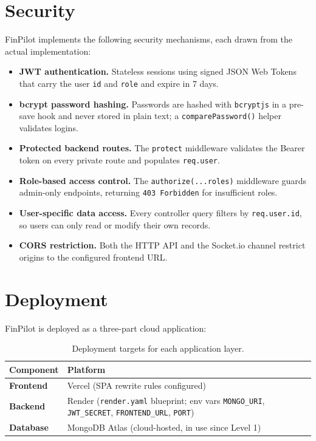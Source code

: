 \documentclass[11pt,a4paper]{report}
\begin{document}
\chapter{Security}
FinPilot implements the following security mechanisms, each drawn from the actual
implementation:
\begin{itemize}[leftmargin=1.4em]
  \item \textbf{JWT authentication.} Stateless sessions using signed JSON Web
        Tokens that carry the user \texttt{id} and \texttt{role} and expire in 7
        days.
  \item \textbf{bcrypt password hashing.} Passwords are hashed with
        \texttt{bcryptjs} in a pre-save hook and never stored in plain text; a
        \texttt{comparePassword()} helper validates logins.
  \item \textbf{Protected backend routes.} The \texttt{protect} middleware
        validates the Bearer token on every private route and populates
        \texttt{req.user}.
  \item \textbf{Role-based access control.} The \texttt{authorize(...roles)}
        middleware guards admin-only endpoints, returning \texttt{403 Forbidden}
        for insufficient roles.
  \item \textbf{User-specific data access.} Every controller query filters by
        \texttt{req.user.id}, so users can only read or modify their own records.
  \item \textbf{CORS restriction.} Both the HTTP API and the Socket.io channel
        restrict origins to the configured frontend URL.
\end{itemize}

\chapter{Deployment}
FinPilot is deployed as a three-part cloud application:
\begin{table}[H]
\centering
\begin{tabularx}{\linewidth}{>{\bfseries}l X}
\toprule
Component & Platform \\
\midrule
Frontend & Vercel (SPA rewrite rules configured) \\
Backend  & Render (\texttt{render.yaml} blueprint; env vars \texttt{MONGO\_URI}, \texttt{JWT\_SECRET}, \texttt{FRONTEND\_URL}, \texttt{PORT}) \\
Database & MongoDB Atlas (cloud-hosted, in use since Level 1) \\
\bottomrule
\end{tabularx}
\caption{Deployment targets for each application layer.}
\end{table}
\end{document}
